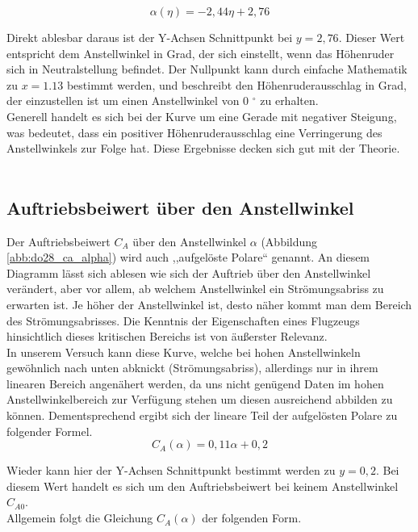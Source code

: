 \begin{equation}
\alpha(\eta) = -2,44\eta + 2,76
\end{equation} 

\vspace{5mm} \noindent
Direkt ablesbar daraus ist der Y-Achsen Schnittpunkt bei $y = 2,76$. Dieser Wert entspricht dem Anstellwinkel in Grad, der sich einstellt, wenn das Höhenruder sich in Neutralstellung befindet. Der Nullpunkt kann durch einfache Mathematik zu $x=1.13$ bestimmt werden, und beschreibt den Höhenruderausschlag in Grad, der einzustellen ist um einen Anstellwinkel von 0 $^\circ$ zu erhalten.\\
Generell handelt es sich bei der Kurve um eine Gerade mit negativer Steigung, was bedeutet, dass ein positiver Höhenruderausschlag eine Verringerung des Anstellwinkels zur Folge hat. Diese Ergebnisse decken sich gut mit der Theorie.\\\\

\subsection{Auftriebsbeiwert über den Anstellwinkel}
Der Auftriebsbeiwert $C_A$ über den Anstellwinkel $\alpha$ (Abbildung \ref{abb:do28_ca_alpha}) wird auch ,,aufgelöste Polare`` genannt. An diesem Diagramm lässt sich ablesen wie sich der Auftrieb über den Anstellwinkel verändert, aber vor allem, ab welchem Anstellwinkel ein Strömungsabriss zu erwarten ist. Je höher der Anstellwinkel ist, desto näher kommt man dem Bereich des Strömungsabrisses. Die Kenntnis der Eigenschaften eines Flugzeugs hinsichtlich dieses kritischen Bereichs ist von äußerster Relevanz.\\
In unserem Versuch kann diese Kurve, welche bei hohen Anstellwinkeln gewöhnlich nach unten abknickt (Strömungsabriss), allerdings nur in ihrem linearen Bereich angenähert werden, da uns nicht genügend Daten im hohen Anstellwinkelbereich zur Verfügung stehen um diesen ausreichend abbilden zu können. Dementsprechend ergibt sich der lineare Teil der aufgelösten Polare zu folgender Formel.\\

\begin{equation}  \label{eq:versuch_ca}
C_A(\alpha) = 0,11\alpha + 0,2
\end{equation}

\vspace{3mm} \noindent
Wieder kann hier der Y-Achsen Schnittpunkt bestimmt werden zu $y=0,2$. Bei diesem Wert handelt es sich um den Auftriebsbeiwert bei keinem Anstellwinkel $C_{A0}$. \\
Allgemein folgt die Gleichung $C_A(\alpha)$ der folgenden Form.\\

